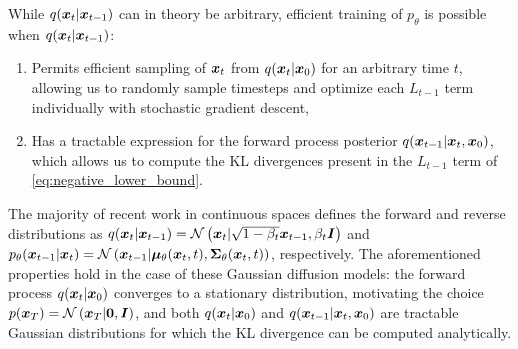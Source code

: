 While $q(\boldsymbol{x}_t | \boldsymbol{x}_{t-1})$ can in theory be arbitrary, efficient training of $p_\theta$ is possible when $q(\boldsymbol{x}_t | \boldsymbol{x}_{t-1})$:
\begin{enumerate}
    \item Permits efficient sampling of $\boldsymbol{x}_t$ from $q(\boldsymbol{x}_t | \boldsymbol{x}_0)$ for an arbitrary time $t$, allowing us to randomly sample timesteps and optimize each $L_{t-1}$ term individually with stochastic gradient descent,
    \item Has a tractable expression for the forward process posterior $q(\boldsymbol{x}_{t-1} | \boldsymbol{x}_{t}, \boldsymbol{x}_0)$, which allows us to compute the KL divergences present in the $L_{t-1}$ term of \eqref{eq:negative_lower_bound}.
\end{enumerate}
The majority of recent work in continuous spaces \citep{ho2020denoising, song2021implicit, wavegrad, nichol2021improved} defines the forward and reverse distributions as $q(\boldsymbol{x}_t|\boldsymbol{x}_{t-1}) = \mathcal N\left(\boldsymbol{x}_{t} | \sqrt{1-\beta_t}\boldsymbol{x}_{t-1}, \beta_t\boldsymbol{I}\right)$ and $p_{\theta}(\boldsymbol{x}_{t-1}|\boldsymbol{x}_{t}) = \mathcal N\left(\boldsymbol{x}_{t-1} | \boldsymbol{\mu}_{\theta}(\boldsymbol{x}_{t}, t), \boldsymbol{\Sigma}_{\theta}(\boldsymbol{x}_{t}, t)\right)$, respectively. 
The aforementioned properties hold in the case of these Gaussian diffusion models:
the forward process $q(\boldsymbol{x}_t | \boldsymbol{x}_0)$ converges to a stationary distribution, motivating the choice $p(\boldsymbol{x}_T) = \mathcal N\left(\boldsymbol{x}_{T} | \boldsymbol{0}, \boldsymbol{I}\right)$, and both $q(\boldsymbol{x}_t|\boldsymbol{x}_{0})$ and $q(\boldsymbol{x}_{t-1} | \boldsymbol{x}_{t}, \boldsymbol{x}_0)$ are tractable Gaussian distributions for which the KL divergence can be computed analytically.